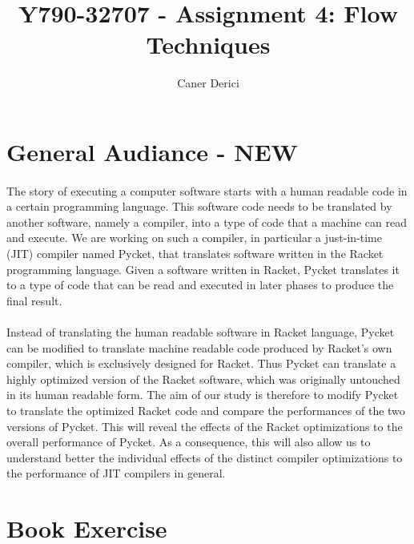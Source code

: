 \documentclass{article}
\title{Y790-32707 - Assignment 4: Flow Techniques}
\author{}
\date{Caner Derici}
\begin{document}

\maketitle%


\section{General Audiance - NEW}

\paragraph{} The story of executing a computer software starts with a human
readable code in a certain programming language. This software code
needs to be translated by another software, namely a compiler, into a
type of code that a machine can read and execute. We are working on
such a compiler, in particular a just-in-time (JIT) compiler named
Pycket, that translates software written in the Racket programming
language. Given a software written in Racket, Pycket translates it to
a type of code that can be read and executed in later phases to
produce the final result.

\paragraph{} Instead of translating the human readable software in Racket language,
Pycket can be modified to translate machine readable code produced by
Racket's own compiler, which is exclusively designed for Racket. Thus
Pycket can translate a highly optimized version of the Racket
software, which was originally untouched in its human readable
form. The aim of our study is therefore to modify Pycket to translate
the optimized Racket code and compare the performances of the two
versions of Pycket. This will reveal the effects of the Racket
optimizations to the overall performance of Pycket. As a consequence,
this will also allow us to understand better the individual effects of
the distinct compiler optimizations to the performance of JIT
compilers in general.


\section{Book Exercise}
\end{document}
